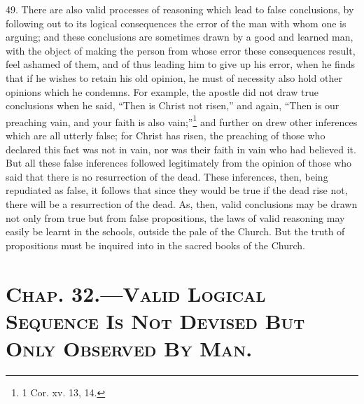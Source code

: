 49. There are also valid processes of reasoning which lead to false
conclusions, by following out to its logical consequences the error of
the man with whom one is arguing; and these conclusions are sometimes
drawn by a good and learned man, with the object of making the person
from whose error these consequences result, feel ashamed of them, and
of thus leading him to give up his error, when he finds that if he
wishes to retain his old opinion, he must of necessity also hold other
opinions which he condemns. For example, the apostle did not draw true
conclusions when he said, ``Then is Christ not risen,'' and again,
``Then is our preaching vain, and your faith is also
vain;''\footnote{1 Cor. xv. 13, 14.} and further on drew other
inferences which are all utterly false; for Christ has risen, the
preaching of those who declared this fact was not in vain, nor was
their faith in vain who had believed it. But all these false
inferences followed legitimately from the opinion of those who said
that there is no resurrection of the dead. These inferences, then,
being repudiated as false, it follows that since they would be true if
the dead rise not, there will be a resurrection of the dead. As, then,
valid conclusions may be drawn not only from true but from false
propositions, the laws of valid reasoning may easily be learnt in the
schools, outside the pale of the Church. But the truth of propositions
must be inquired into in the sacred books of the Church.

\section*{\textsc{Chap}. 32.\smaller---\textsc{Valid Logical Sequence
Is Not Devised But Only Observed By Man}.}

